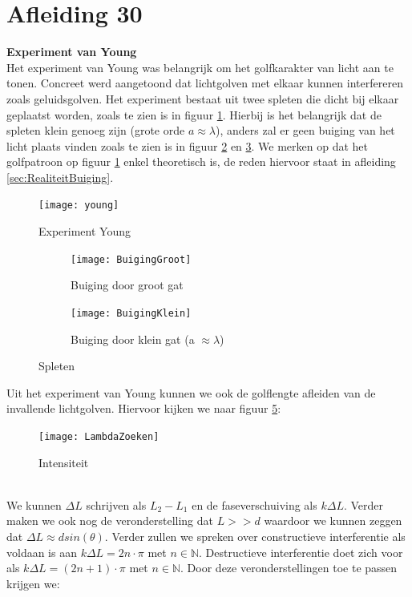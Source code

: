 \documentclass[a4paper,kul]{kulakarticle} %
\begin{document}
\newpage
\section{Afleiding 30}
\label{sec:young}
\textbf{Experiment van Young}\\
Het experiment van Young was belangrijk om het golfkarakter van licht aan te tonen. Concreet werd aangetoond dat lichtgolven met elkaar kunnen interfereren zoals geluidsgolven. Het experiment bestaat uit twee spleten die dicht bij elkaar geplaatst worden, zoals te zien is in figuur \ref{fig:young}. Hierbij is het belangrijk dat de spleten klein genoeg zijn (grote orde $a\approx\lambda$), anders zal er geen buiging van het licht plaats vinden zoals te zien is in figuur \ref{fig:buiginggroot} en \ref{fig:buigingklein}. We merken op dat het golfpatroon op figuur \ref{fig:young} enkel theoretisch is, de reden hiervoor staat in afleiding \ref{sec:RealiteitBuiging}.
\begin{figure}[!h]
	\centering
	\texttt{[image: young]}
	\caption[Experiment Young]{Experiment Young}
	\label{fig:young}
\end{figure}
\begin{figure}[!h]
	\centering
	\begin{subfigure}{.5\textwidth}
		\centering
		\texttt{[image: BuigingGroot]}
		\caption[Buiging grote doorlating]{Buiging door groot gat}
		\label{fig:buiginggroot}
	\end{subfigure}%
	\begin{subfigure}{.5\textwidth}
		\centering
		\texttt{[image: BuigingKlein]}
		\caption[Buiging kleine doorlating]{Buiging door klein gat (a $\approx \lambda$)}
		\label{fig:buigingklein}
	\end{subfigure}
	\caption{Spleten}
	\label{fig:Spleten}
\end{figure}
\newpage
Uit het experiment van Young kunnen we ook de golflengte afleiden van de invallende lichtgolven. Hiervoor kijken we naar figuur \ref{fig:lambdazoeken}:
\begin{figure}[!h]
	\centering
	\texttt{[image: LambdaZoeken]}
	\caption[Berekening intensiteit]{Intensiteit}
	\label{fig:lambdazoeken}
\end{figure}\\
We kunnen $\Delta L$ schrijven als $L_2-L_1$ en de faseverschuiving als $k\Delta L$. Verder maken we ook nog de veronderstelling dat $L>>d$ waardoor we kunnen zeggen dat $\Delta L \approx dsin(\theta)$. Verder zullen we spreken over constructieve interferentie als voldaan is aan $k\Delta L = 2n\cdot\pi$ met $n\in\mathbb{N}$. Destructieve interferentie doet zich voor als $k\Delta L = (2n+1)\cdot\pi$ met $n\in\mathbb{N}$. Door deze veronderstellingen toe te passen krijgen we:
\end{document}
